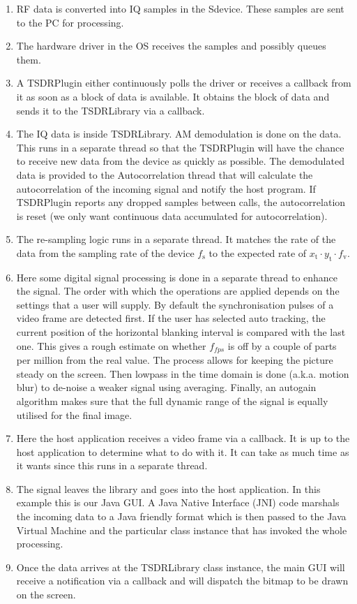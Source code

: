\documentclass[a4paper,12pt,twoside,openright]{report}
\begin{document}
\begin{enumerate}
	\item RF data is converted into IQ samples in the Sdevice. These samples are sent to the PC for processing.
	\item The hardware driver in the OS receives the samples and possibly queues them.
	\item A TSDRPlugin either continuously polls the driver or receives a callback from it as soon as a block of data is available. It obtains the block of data and sends it to the TSDRLibrary via a callback.
	\item The IQ data is inside TSDRLibrary. AM demodulation is done on the data. This runs in a separate thread so that the TSDRPlugin will have the chance to receive new data from the device as quickly as possible. The demodulated data is provided to the Autocorrelation thread that will calculate the autocorrelation of the incoming signal and notify the host program. If TSDRPlugin reports any dropped samples between calls, the autocorrelation is reset (we only want continuous data accumulated for autocorrelation).
	\item The re-sampling logic runs in a separate thread. It matches the rate of the data from the sampling rate of the device $f_\text{s}$ to the expected rate of $x_\text{t} \cdot y_\text{t} \cdot f_\text{v}$.
	\item Here some digital signal processing is done in a separate thread to enhance the signal. The order with which the operations are applied depends on the settings that a user will supply. By default the synchronisation pulses of a video frame are detected first. If the user has selected auto tracking, the current position of the horizontal blanking interval is compared with the last one. This gives a rough estimate on whether $f_{fps}$ is off by a couple of parts per million from the real value. The process allows for keeping the picture steady on the screen. Then lowpass in the time domain is done (a.k.a. motion blur) to de-noise a weaker signal using averaging. Finally, an autogain algorithm makes sure that the full dynamic range of the signal is equally utilised for the final image.
	\item Here the host application receives a video frame via a callback. It is up to the host application to determine what to do with it. It can take as much time as it wants since this runs in a separate thread.
	\item The signal leaves the library and goes into the host application. In this example this is our Java GUI. A Java Native Interface (JNI) code marshals the incoming data to a Java friendly format which is then passed to the Java Virtual Machine and the particular class instance that has invoked the whole processing.
	\item Once the data arrives at the TSDRLibrary class instance, the main GUI will receive a notification via a callback and will dispatch the bitmap to be drawn on the screen.
\end{enumerate}
\end{document}

